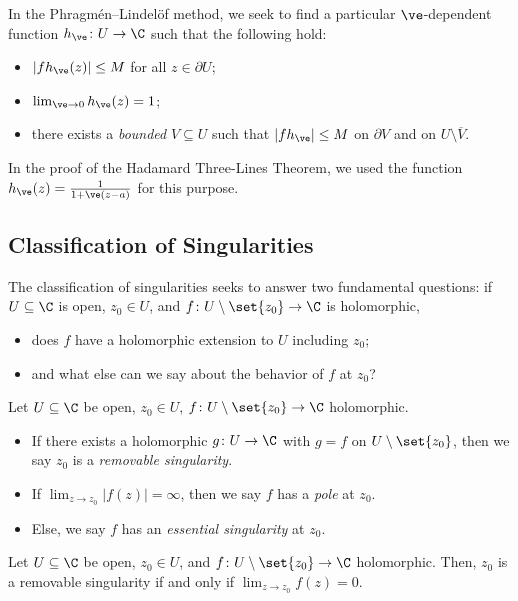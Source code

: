 \documentclass[10pt]{mypackage}
\begin{document}
In the Phragmén--Lindelöf method, we seek to find a particular $\ve$-dependent function $h_{\ve}\colon U\rightarrow \C$ such that the following hold:
\begin{itemize}
  \item $\left\vert fh_{\ve}(z) \right\vert \leq M$ for all $z\in \partial U$;
  \item $\lim_{\ve\rightarrow 0} h_{\ve}(z) = 1$;
  \item there exists a \textit{bounded} $V\subseteq U$ such that $\left\vert fh_{\ve} \right\vert\leq M$ on $\partial V$ and on $U\setminus \overline{V}$.
\end{itemize}
In the proof of the Hadamard Three-Lines Theorem, we used the function $h_{\ve}(z) = \frac{1}{ 1 + \ve (z-a) }$ for this purpose.
\subsection{Classification of Singularities}%
The classification of singularities seeks to answer two fundamental questions: if $U\subseteq \C$ is open, $z_0\in U$, and $f\colon U\setminus \set{z_0}\rightarrow \C$ is holomorphic, 
\begin{itemize}
  \item does $f$ have a holomorphic extension to $U$ including $z_0$;
  \item and what else can we say about the behavior of $f$ at $z_0$?
\end{itemize}
\begin{definition}
  Let $U\subseteq \C$ be open, $z_0\in U$, $f\colon U\setminus \set{z_0}\rightarrow \C$ holomorphic.
  \begin{itemize}
    \item If there exists a holomorphic $g\colon U\rightarrow \C$ with $g = f$ on $U\setminus \set{z_0}$, then we say $z_0$ is a \textit{removable singularity}.
    \item If $\lim_{z\rightarrow z_0} \left\vert f(z) \right\vert = \infty$, then we say $f$ has a \textit{pole} at $z_0$.
    \item Else, we say $f$ has an \textit{essential singularity} at $z_0$.
  \end{itemize}
\end{definition}
\begin{theorem}
  Let $U\subseteq \C$ be open, $z_0\in U$, and $f\colon U\setminus \set{z_0}\rightarrow \C$ holomorphic. Then, $z_0$ is a removable singularity if and only if $\lim_{z\rightarrow z_0}f(z) = 0$.
\end{theorem}
\end{document}
